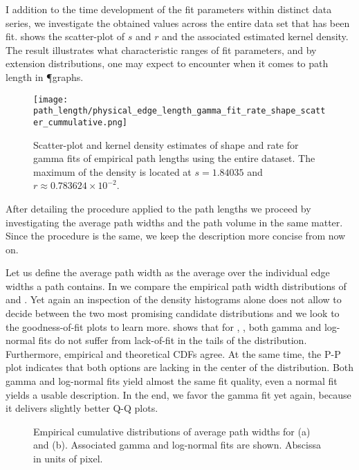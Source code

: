 		I addition to the time development of the fit parameters within distinct data series, we investigate the obtained values across the entire data set that has been fit.  shows the scatter-plot of $s$ and $r$ and the associated estimated kernel density. The result illustrates what characteristic ranges of fit parameters, and by extension distributions, one may expect to encounter when it comes to path length in \P graphs.

		\begin{figure}[!htbp]
			\centering
				\texttt{[image: path\_length/physical\_edge\_length\_gamma\_fit\_rate\_shape\_scatter\_cummulative.png]}
			\caption[Path length distribution fit parameter densities.]{Scatter-plot and kernel density estimates of shape and rate for gamma fits of empirical path lengths using the entire dataset. The maximum of the density is located at $s = 1.84035$ and $r \approx 0.783624 \times 10^{-2}$.}
			\label{fig:path_lengths_gamma_fit_kde}
		\end{figure}

		After detailing the procedure applied to the path lengths we proceed by investigating the average path widths and the path volume in the same matter. Since the procedure is the same, we keep the description more concise from now on.

		Let us define the average path width as the average over the individual edge widths a path contains. In  we compare the empirical path width distributions of  and . Yet again an inspection of the density histograms alone does not allow to decide between the two most promising candidate distributions and we look to the goodness-of-fit plots to learn more.  shows that for , , both gamma and log-normal fits do not suffer from lack-of-fit in the tails of the distribution. Furthermore, empirical and theoretical CDFs agree. At the same time, the P-P plot indicates that both options are lacking in the center of the distribution. Both gamma and log-normal fits yield almost the same fit quality, even a normal fit yields a usable description. In the end, we favor the gamma fit yet again, because it delivers slightly better Q-Q plots. 

		\begin{figure}
			\centering
			\qquad

			\caption[Path width distributions.]{Empirical cumulative distributions of average path widths for  (a) and  (b). Associated gamma and log-normal fits are shown. Abscissa in units of pixel.}
			\label{fig:path_widths}
		\end{figure}

